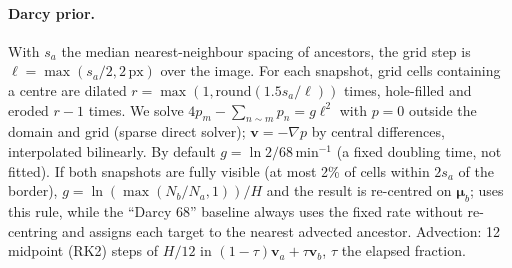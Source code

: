 \paragraph{Darcy prior.}
With $s_a$ the median nearest-neighbour spacing of ancestors, the grid step is $\ell=\max(s_a/2,2\,\text{px})$ over the image.
For each snapshot, grid cells containing a centre are dilated $r=\max(1,\mathrm{round}(1.5s_a/\ell))$ times, hole-filled and eroded $r{-}1$ times.
We solve $4p_m-\sum_{n\sim m}p_n=g\ell^2$ with $p{=}0$ outside the domain and grid (sparse direct solver); $\mathbf{v}=-\nabla p$ by central differences, interpolated bilinearly.
By default $g=\ln2/68$\,min$^{-1}$ (a fixed doubling time, not fitted). If both snapshots are fully visible (at most 2\% of cells within $2s_a$ of the border), $g=\ln(\max(N_b/N_a,1))/H$ and the result is re-centred on $\boldsymbol\mu_b$; \ours uses this rule, while the ``Darcy 68'' baseline always uses the fixed rate without re-centring and assigns each target to the nearest advected ancestor.
Advection: 12 midpoint (RK2) steps of $H/12$ in $(1{-}\tau)\mathbf{v}_a{+}\tau\mathbf{v}_b$, $\tau$ the elapsed fraction.

